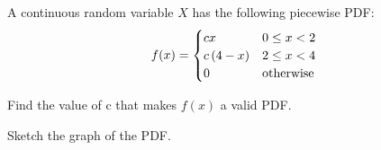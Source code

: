 \documentclass[a4paper, 10pt]{article}
\begin{document}
\begin{problem}
A continuous random variable \( X \) has the following piecewise PDF:
\[
	f(x) = \begin{cases}
		cx             & 0 \leq x < 2     \\
		c\left(4 - x\right) & 2 \leq x < 4     \\
		0              & \text{otherwise}
	\end{cases}
\]
\begin{subproblems_alpha}
	\item Find the value of c that makes \( f(x) \) a valid PDF.
	\item Sketch the graph of the PDF.
\end{subproblems_alpha}
\end{problem}
\end{document}
